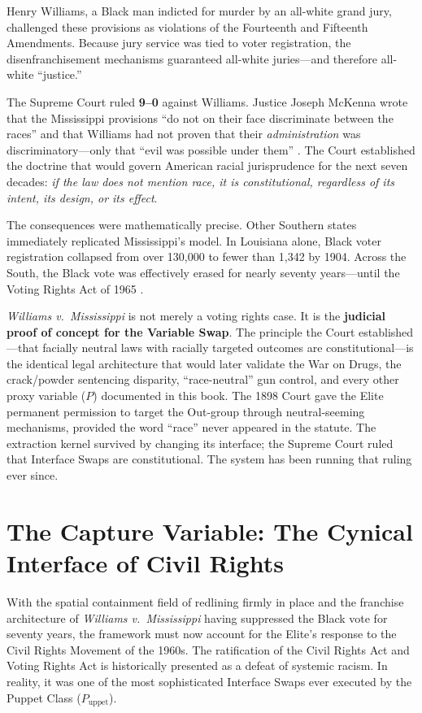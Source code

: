\documentclass[12pt,openany]{book}
\begin{document}
Henry Williams, a Black man indicted for murder by an all-white grand jury, challenged these provisions as violations of the Fourteenth and Fifteenth Amendments. Because jury service was tied to voter registration, the disenfranchisement mechanisms guaranteed all-white juries---and therefore all-white ``justice.''

The Supreme Court ruled \textbf{9--0} against Williams. Justice Joseph McKenna wrote that the Mississippi provisions ``do not on their face discriminate between the races'' and that Williams had not proven that their \textit{administration} was discriminatory---only that ``evil was possible under them'' \cite{williams_v_miss}. The Court established the doctrine that would govern American racial jurisprudence for the next seven decades: \textit{if the law does not mention race, it is constitutional, regardless of its intent, its design, or its effect}.

The consequences were mathematically precise. Other Southern states immediately replicated Mississippi's model. In Louisiana alone, Black voter registration collapsed from over 130,000 to fewer than 1,342 by 1904. Across the South, the Black vote was effectively erased for nearly seventy years---until the Voting Rights Act of 1965 \cite{williams_v_miss}.

\textit{Williams v.\ Mississippi} is not merely a voting rights case. It is the \textbf{judicial proof of concept for the Variable Swap}. The principle the Court established---that facially neutral laws with racially targeted outcomes are constitutional---is the identical legal architecture that would later validate the War on Drugs, the crack/powder sentencing disparity, ``race-neutral'' gun control, and every other proxy variable ($P$) documented in this book. The 1898 Court gave the Elite permanent permission to target the Out-group through neutral-seeming mechanisms, provided the word ``race'' never appeared in the statute. The extraction kernel survived by changing its interface; the Supreme Court ruled that Interface Swaps are constitutional. The system has been running that ruling ever since.

\section{The Capture Variable: The Cynical Interface of Civil Rights}

With the spatial containment field of redlining firmly in place and the franchise architecture of \textit{Williams v.\ Mississippi} having suppressed the Black vote for seventy years, the framework must now account for the Elite's response to the Civil Rights Movement of the 1960s. The ratification of the Civil Rights Act and Voting Rights Act is historically presented as a defeat of systemic racism. In reality, it was one of the most sophisticated Interface Swaps ever executed by the Puppet Class ($P_{\text{uppet}}$).
\end{document}
